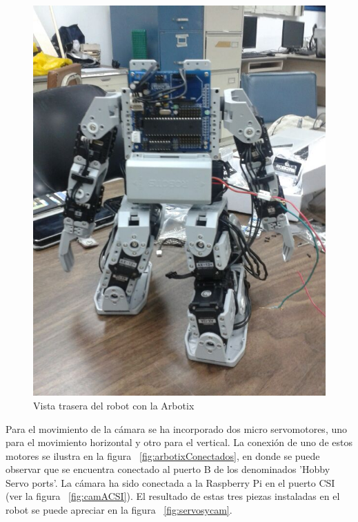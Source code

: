 \begin{figure}[hbtp]
\centering
\includegraphics[scale=0.2]{imagenes/traseroDeJunny.jpg}
\caption{Vista trasera del robot con la Arbotix}
\label{fig:trasera2}
\end{figure}



Para el movimiento de la cámara se ha incorporado dos micro servomotores, uno para el movimiento horizontal y otro para el vertical. La conexión de uno de estos motores se ilustra en la figura ~\ref{fig:arbotixConectados}, en donde se puede observar que se encuentra conectado al puerto B de los denominados 'Hobby Servo ports'. La cámara ha sido conectada a la Raspberry Pi en el puerto CSI (ver la figura ~\ref{fig:camACSI}). El resultado de estas tres piezas instaladas en el robot se puede apreciar en la figura ~\ref{fig:servosycam}.


